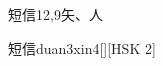 \begin{entry}{短信}{12,9}{⽮、⼈}
  \begin{phonetics}{短信}{duan3xin4}[][HSK 2]
  \end{phonetics}
\end{entry}
